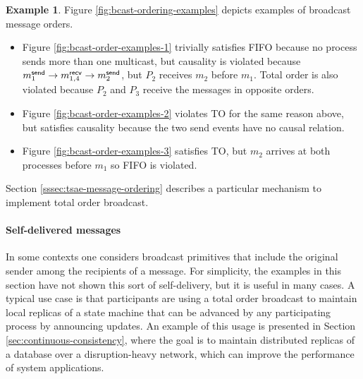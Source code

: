 \documentclass[]             %
{NASA}                       %
\theoremstyle{definition}
\newtheorem{example}[theorem]{Example}
\providecommand{\tightlist}{%
  \setlength{\itemsep}{0pt}\setlength{\parskip}{0pt}}
\begin{document}
\begin{example}
Figure \ref{fig:bcast-ordering-examples} depicts examples of broadcast
message orders.
\begin{itemize}
  \tightlist
\item Figure \ref{fig:bcast-order-examples-1} trivially satisfies FIFO
  because no process sends more than one multicast, but causality is
  violated because $m_{1}^{\mathsf{send}} \to m_{1,4}^{\mathsf{recv}} \to m_{2}^{\mathsf{send}}$, but
  $P_2$ receives $m_2$ before $m_1$. Total order is also violated
  because $P_2$ and $P_3$ receive the messages in opposite orders.
\item Figure \ref{fig:bcast-order-examples-2} violates TO for the same
  reason above, but satisfies causality because the two send events
  have no causal relation.
\item Figure \ref{fig:bcast-order-examples-3}
  satisfies TO, but $m_2$ arrives at both processes before $m_1$ so
  FIFO is violated.
\end{itemize}
\end{example}
Section \ref{sssec:tsae-message-ordering} describes a particular
mechanism to implement total order broadcast.
\paragraph{Self-delivered messages}
In some contexts one considers broadcast primitives that include the
original sender among the recipients of a message. For simplicity, the
examples in this section have not shown this sort of self-delivery,
but it is useful in many cases. A typical use case is that
participants are using a total order broadcast to maintain local
replicas of a state machine that can be advanced by any participating
process by announcing updates. An example of this usage is presented
in Section \ref{sec:continuous-consistency}, where the goal is to
maintain distributed replicas of a database over a disruption-heavy
network, which can improve the performance of system applications.

\end{document}
